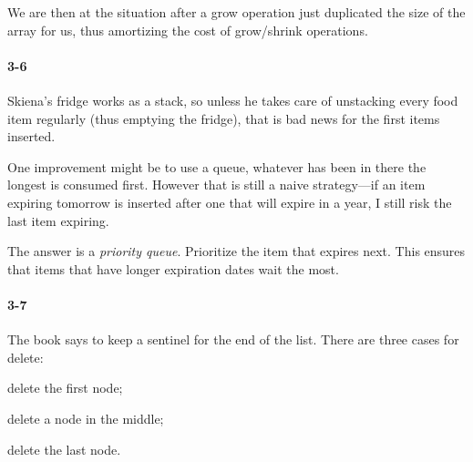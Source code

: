 \documentclass{report}
\begin{document}
\begin{enumerate}[label=\alph*)]
        We are then at the situation after a grow operation just duplicated the size of
        the array for us, thus amortizing the cost of grow/shrink operations.
\end{enumerate}

\paragraph{3-6}Skiena's fridge works as a stack, so unless he takes care of unstacking every food item regularly (thus emptying the fridge), that is bad news for the first items inserted.

One improvement might be to use a queue, whatever has been in there the longest is consumed first. However that is still a naive strategy---if an item expiring tomorrow is inserted after one that will expire in a year, I still risk the last item expiring.

The answer is a \emph{priority queue}. Prioritize the item that expires next. This ensures that items that have longer expiration dates wait the most.

\paragraph{3-7} The book says to keep a sentinel for the end of the list. There are three cases for delete: \begin{enumerate*}[label=\arabic*)]\item delete the first node; \item delete a node in the middle; \item delete the last node.\end{enumerate*}
\end{document}
